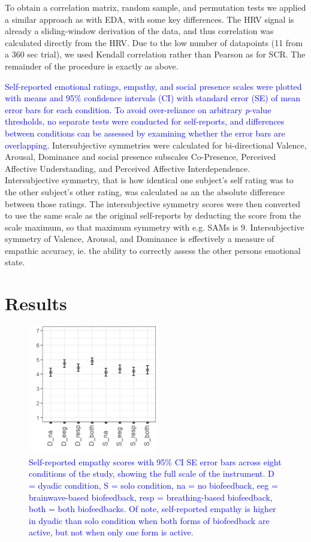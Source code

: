 \documentclass[manuscript, review = false, screen]{acmart}
\begin{document}
To obtain a correlation matrix, random sample, and permutation tests we applied a similar approach as with EDA, with some key differences. The HRV signal is already a sliding-window derivation of the data, and thus correlation was calculated directly from the HRV. Due to the low number of datapoints (11 from a 360 sec trial), we used Kendall correlation rather than Pearson as for SCR. The remainder of the procedure is exactly as above.

\textcolor{blue}{Self-reported emotional ratings, empathy, and social presence scales were plotted with means and 95\% confidence intervals (CI) with standard error (SE) of mean error bars for each condition. To avoid over-reliance on arbitrary \textit{p}-value thresholds, no separate tests were conducted for self-reports, and differences between conditions can be assessed by examining whether the error bars are overlapping.} Intersubjective symmetries were calculated for bi-directional Valence, Arousal, Dominance and social presence subscales Co-Presence, Perceived Affective Understanding, and Perceived Affective Interdependence. Intersubjective symmetry, that is how identical one subject's self rating was to the other subject's other rating, was calculated as an the absolute difference between those ratings. The intersubjective symmetry scores were then converted to use the same scale as the original self-reports by deducting the score from the scale maximum, so that maximum symmetry with e.g. SAMs is 9. Intersubjective symmetry of Valence, Arousal, and Dominance is effectively a measure of empathic accuracy, ie. the ability to correctly assess the other persons emotional state.

\section{Results}

\begin{figure}
    \centering
    \includegraphics[width=0.5\textwidth]{images/EMP.png}
    \caption{\textcolor{blue}{Self-reported empathy scores with 95\% CI SE error bars across eight conditions of the study, showing the full scale of the instrument. D = dyadic condition, S = solo condition, na = no biofeedback, eeg = brainwave-based biofeedback, resp = breathing-based biofeedback, both = both biofeedbacks. Of note, self-reported empathy is higher in dyadic than solo condition when both forms of biofeedback are active, but not when only one form is active.}}
    \label{fig:batson}
\end{figure}
\end{document}
